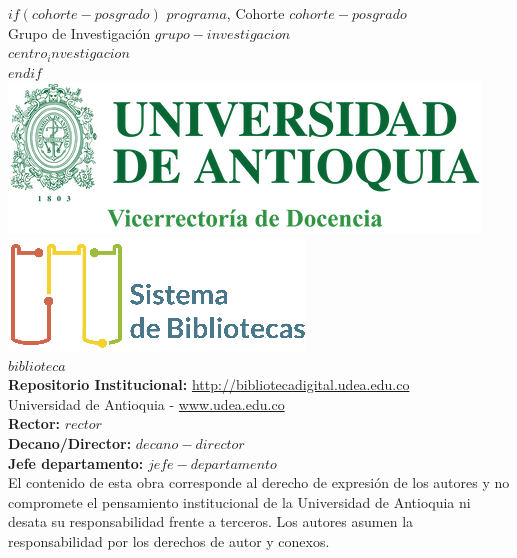 \vspace{1cm}
$if(cohorte-posgrado)$
\noindent
{$programa$, Cohorte $cohorte-posgrado$}\\
{Grupo de Investigación $grupo-investigacion$}\\
{$centro_investigacion$}\\[1cm]
$endif$
%
\includegraphics{assets/escudo_udea_vice.png}\quad
\includegraphics{assets/sis_biblo.png}\\
{$biblioteca$}\\[1cm]
%
{\textbf{Repositorio Institucional:} \url{http://bibliotecadigital.udea.edu.co}}\\[1cm]
{Universidad de Antioquia - \url{www.udea.edu.co}}\\[0.5cm]
%
{\textbf{Rector:} $rector$}\\
{\textbf{Decano/Director:} $decano-director$}\\
{\textbf{Jefe departamento:} $jefe-departamento$}\\[1cm]
%
El contenido de esta obra corresponde al derecho de expresión de los autores y no compromete el pensamiento institucional de la Universidad de Antioquia ni desata su responsabilidad frente a terceros. Los autores asumen la responsabilidad por los derechos de autor y conexos.
\newpage

